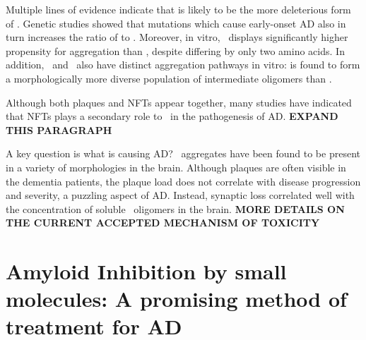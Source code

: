 Multiple lines of evidence indicate that \abetafortytwo is likely to be the more deleterious form of \abeta. Genetic studies showed that mutations which cause early-onset AD also in turn increases the ratio of \abetafortytwo to \abetaforty.\cite{Hardy:1997tu} Moreover, in vitro, \abetafortytwo\ displays significantly higher propensity for aggregation than \abetaforty, despite differing by only two amino acids. In addition, \abetaforty\ and \abetafortytwo\ also have distinct aggregation pathways in vitro: \abetafortytwo is found to form a morphologically more diverse population of intermediate oligomers than \abetaforty.\cite{Bitan:2003ut} %

Although both plaques and NFTs appear together, many studies have indicated that NFTs plays a secondary role to \abeta\ in the pathogenesis of AD.\cite{XXX} \textbf{EXPAND THIS PARAGRAPH} %


A key question is what is causing AD? \abeta\ aggregates have been found to be present in a variety of morphologies in the brain. Although plaques are often visible in the dementia patients, the plaque load does not correlate with disease progression and severity, a puzzling aspect of AD.  Instead, synaptic loss correlated well with the concentration of soluble \abeta\ oligomers in the brain. \textbf{MORE DETAILS ON THE CURRENT ACCEPTED MECHANISM OF TOXICITY}

\section{Amyloid Inhibition by small molecules: A promising method of treatment for AD}

